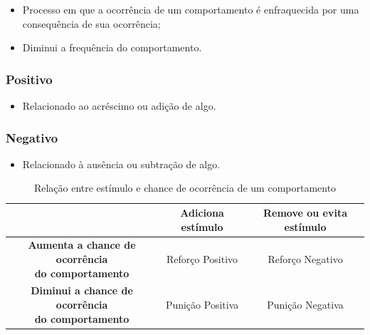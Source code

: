 \documentclass{article}
\begin{document}
                \begin{itemize}
                    \item Processo em que a ocorrência de um comportamento é enfraquecida por uma consequência de sua ocorrência;
                    \item Diminui a frequência do comportamento.
                \end{itemize}
                
            \subsubsection{Positivo}
            
                \begin{itemize}
                    \item Relacionado ao acréscimo ou adição de algo.
                \end{itemize}
            
            \subsubsection{Negativo}
    
                \begin{itemize}
                    \item Relacionado à ausência ou subtração de algo.
                \end{itemize}
            
            \begin{table}[ht]
                \centering
                \begin{tabular}{|c|c|c|}
                    \hline
                     & \textbf{Adiciona estímulo} & \textbf{Remove ou evita estímulo} \\
                    \hline
                    \makecell{\textbf{Aumenta a chance de ocorrência} \\ \textbf{do comportamento}} & Reforço Positivo & Reforço Negativo \\ 
                    \hline
                    \makecell{\textbf{Diminui a chance de ocorrência} \\ \textbf{do comportamento}} & Punição Positiva & Punição Negativa \\ 
                    \hline
                \end{tabular}
                \caption{Relação entre estímulo e chance de ocorrência de um comportamento}
                \label{tab:reforco-punicao}
            \end{table}
            
\end{document}
